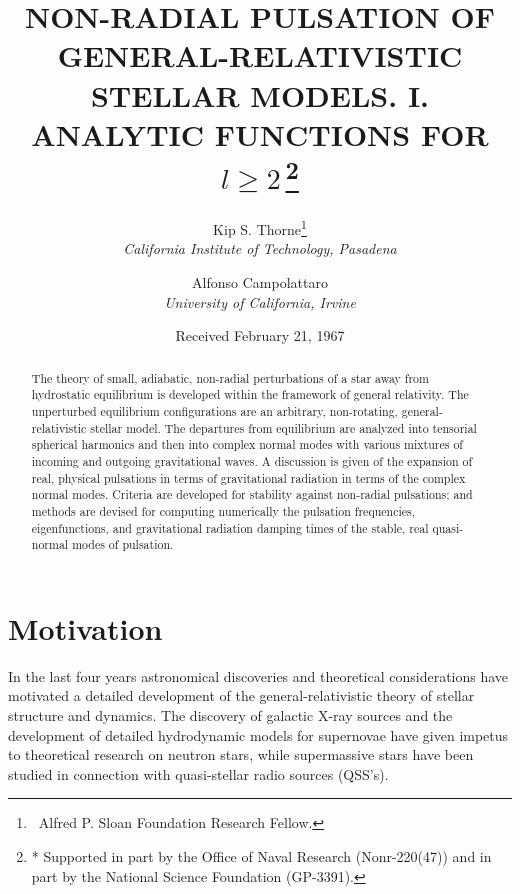 \documentclass[12pt]{article}
\begin{document}

\title{NON-RADIAL PULSATION OF GENERAL-RELATIVISTIC STELLAR MODELS.
I. ANALYTIC FUNCTIONS FOR $l \geq 2$\,\footnote{* Supported in part by the Office of Naval Research (Nonr-220(47)) and in part by the National Science Foundation (GP-3391).}}

\author{Kip S. Thorne\footnote{\dag\ Alfred P. Sloan Foundation Research Fellow.}\\
\textit{California Institute of Technology, Pasadena}\\
\and
Alfonso Campolattaro\\
\textit{University of California, Irvine}}

\date{Received February 21, 1967}

\maketitle

\begin{abstract}
The theory of small, adiabatic, non-radial perturbations of a star away from hydrostatic equilibrium
is developed within the framework of general relativity. The unperturbed equilibrium configurations are
an arbitrary, non-rotating, general-relativistic stellar model. The departures from equilibrium are
analyzed into tensorial spherical harmonics and then into complex normal modes with various mixtures
of incoming and outgoing gravitational waves. A discussion is given of the expansion of real, physical
pulsations in terms of gravitational radiation in terms of the complex normal modes. Criteria
are developed for stability against non-radial pulsations; and methods are devised for computing numerically the pulsation frequencies, eigenfunctions, and gravitational radiation damping times of the stable,
real quasi-normal modes of pulsation.
\end{abstract}

\section{Motivation}

In the last four years astronomical discoveries and theoretical considerations have
motivated a detailed development of the general-relativistic theory of stellar structure
and dynamics. The discovery of galactic X-ray sources and the development of detailed
hydrodynamic models for supernovae have given impetus to theoretical research on neutron
stars, while supermassive stars have been studied in connection with quasi-stellar radio
sources (QSS's).
\end{document}
